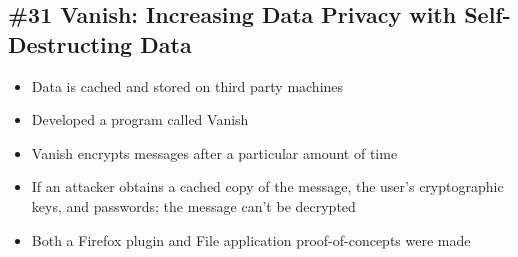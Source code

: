 \subsection*{\#31 Vanish: Increasing Data Privacy with Self-Destructing Data}
\begin{itemize}
	\item Data is cached and stored on third party machines
	\item Developed a program called Vanish
	\item Vanish encrypts messages after a particular amount of time
	\item If an attacker obtains a cached copy of the message, the user's cryptographic keys, and passwords; the message can't be decrypted
	\item Both a Firefox plugin and File application proof-of-concepts were made
\end{itemize}